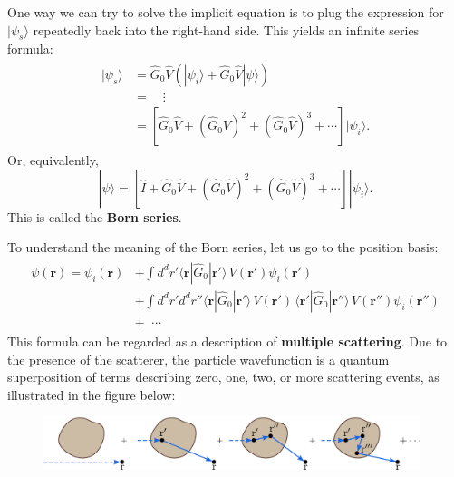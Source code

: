 \documentclass[pra,12pt]{revtex4}
\begin{document}
One way we can try to solve the implicit equation is to plug the
expression for $|\psi_s\rangle$ repeatedly back into the right-hand
side.  This yields an infinite series formula:
\begin{align}
  \begin{aligned}|\psi_s\rangle &= \hat{G}_0 \hat{V} \left(|\psi_i\rangle + \hat{G}_0 \hat{V}|\psi\rangle\right) \\ &= \quad \vdots \\ &= \left[\hat{G}_0 \hat{V} + (\hat{G}_0 \hat{V})^2 + (\hat{G}_0 \hat{V})^3 + \cdots\right]|\psi_i\rangle.\end{aligned}
\end{align}
Or, equivalently,
\begin{equation}
  |\psi\rangle = \left[\hat{I} + \hat{G}_0 \hat{V} + (\hat{G}_0 \hat{V})^2 + (\hat{G}_0 \hat{V})^3 + \cdots\right]|\psi_i\rangle.
\end{equation}
This is called the \textbf{Born series}.

To understand the meaning of the Born series, let us go to the
position basis:
\begin{align}
  \begin{aligned}\psi(\mathbf{r}) = \psi_i(\mathbf{r}) &+ \int d^dr' \langle \mathbf{r} | \hat{G}_0 |\mathbf{r}'\rangle\, V(\mathbf{r}') \psi_i(\mathbf{r}') \\ &+ \int d^dr' d^dr'' \langle \mathbf{r} | \hat{G}_0 |\mathbf{r}'\rangle\, V(\mathbf{r}') \, \langle \mathbf{r}' | \hat{G}_0 |\mathbf{r}''\rangle \, V(\mathbf{r}'') \psi_i(\mathbf{r}'') \\ &+ \;\;\cdots\end{aligned}
\end{align}
This formula can be regarded as a description of \textbf{multiple
  scattering}.  Due to the presence of the scatterer, the particle
wavefunction is a quantum superposition of terms describing zero, one,
two, or more scattering events, as illustrated in the figure below:

\begin{figure}[h!]
  \centering\includegraphics[width=0.98\textwidth]{bornseries}
\end{figure}
\end{document}
